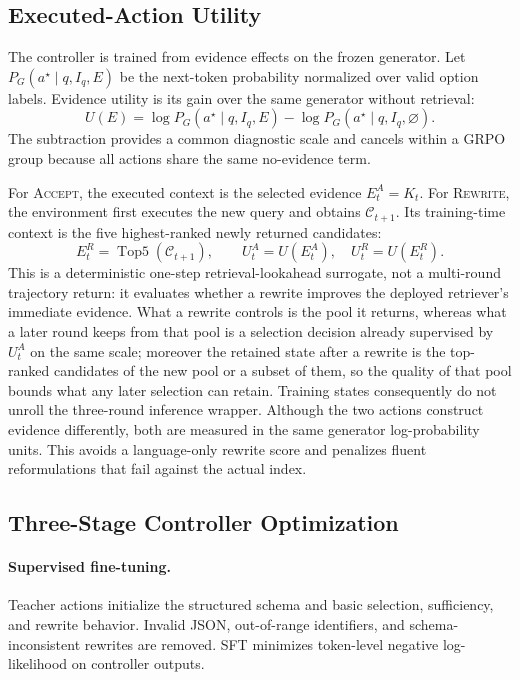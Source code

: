 \subsection{Executed-Action Utility}
\label{sec:utility}

The controller is trained from evidence effects on the frozen generator. Let
$P_G(a^\star\mid q,I_q,E)$ be the next-token probability normalized over valid
option labels. Evidence utility is its gain over the same generator without
retrieval:
\begin{equation}
 U(E)=\log P_G(a^\star\mid q,I_q,E)
      -\log P_G(a^\star\mid q,I_q,\varnothing).
 \label{eq:utility}
\end{equation}
The subtraction provides a common diagnostic scale and cancels within a GRPO
group because all actions share the same no-evidence term.

For \textsc{Accept}, the executed context is the selected evidence
$E_t^A=K_t$. For \textsc{Rewrite}, the environment first executes the
new query and obtains $\mathcal{C}_{t+1}$. Its training-time context is the
five highest-ranked newly returned candidates:
\begin{equation}
 E_t^R=\operatorname{Top5}(\mathcal{C}_{t+1}),\qquad
 U_t^A=U(E_t^A),\quad U_t^R=U(E_t^R).
 \label{eq:branch-utility}
\end{equation}
This is a deterministic one-step retrieval-lookahead surrogate, not a
multi-round trajectory return: it evaluates whether a rewrite improves the
deployed retriever's immediate evidence. What a rewrite controls is the pool it
returns, whereas what a later round keeps from that pool is a selection decision
already supervised by $U_t^A$ on the same scale; moreover the retained state
after a rewrite is the top-ranked candidates of the new pool or a subset of
them, so the quality of that pool bounds what any later selection can retain.
Training states consequently do not unroll the three-round inference wrapper.
Although the two actions construct evidence differently, both are measured in
the same generator log-probability units.
This avoids a language-only rewrite score and penalizes fluent reformulations
that fail against the actual index.

\subsection{Three-Stage Controller Optimization}
\label{sec:optimization}

\paragraph{Supervised fine-tuning.}
Teacher actions initialize the structured schema and basic selection,
sufficiency, and rewrite behavior. Invalid JSON, out-of-range identifiers, and
schema-inconsistent rewrites are removed. SFT minimizes token-level negative
log-likelihood on controller outputs.

